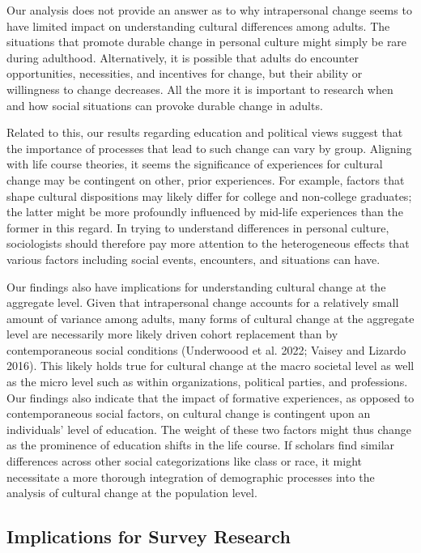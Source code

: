 \documentclass[
  12pt,
]{article}
\begin{document}
Our analysis does not provide an answer as to why intrapersonal change
seems to have limited impact on understanding cultural differences among
adults. The situations that promote durable change in personal culture
might simply be rare during adulthood. Alternatively, it is possible
that adults do encounter opportunities, necessities, and incentives for
change, but their ability or willingness to change decreases. All the
more it is important to research when and how social situations can
provoke durable change in adults.

Related to this, our results regarding education and political views
suggest that the importance of processes that lead to such change can
vary by group. Aligning with life course theories, it seems the
significance of experiences for cultural change may be contingent on
other, prior experiences. For example, factors that shape cultural
dispositions may likely differ for college and non-college graduates;
the latter might be more profoundly influenced by mid-life experiences
than the former in this regard. In trying to understand differences in
personal culture, sociologists should therefore pay more attention to
the heterogeneous effects that various factors including social events,
encounters, and situations can have.

Our findings also have implications for understanding cultural change at
the aggregate level. Given that intrapersonal change accounts for a
relatively small amount of variance among adults, many forms of cultural
change at the aggregate level are necessarily more likely driven cohort
replacement than by contemporaneous social conditions (Underwoood et al.
2022; Vaisey and Lizardo 2016). This likely holds true for cultural
change at the macro societal level as well as the micro level such as
within organizations, political parties, and professions. Our findings
also indicate that the impact of formative experiences, as opposed to
contemporaneous social factors, on cultural change is contingent upon an
individuals' level of education. The weight of these two factors might
thus change as the prominence of education shifts in the life course. If
scholars find similar differences across other social categorizations
like class or race, it might necessitate a more thorough integration of
demographic processes into the analysis of cultural change at the
population level.

\hypertarget{implications-for-survey-research}{%
\subsection{Implications for Survey
Research}\label{implications-for-survey-research}}
\end{document}

